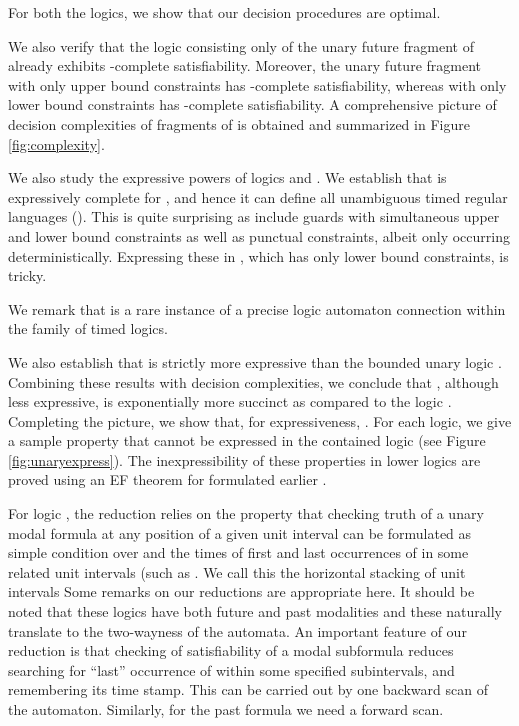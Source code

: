 \documentclass{llncs}
\newcommand{\oomit}[1]{}
\newcommand{\mtlus}{\mbox{}}
\newcommand{\mitlfp}{\mbox{}}
\newcommand{\bmitlfp}{\mbox{}}
\newcommand{\tptlus}{\mbox{}}
\newcommand{\potdta}{\mbox{}}
\newcommand{\ttlxy}{\mbox{}}
\newcommand{\mitlfpinf}{\mbox{}}
\newcommand{\mitlfpb}{\bmitlfp}
\newcommand{\mitl}{\mbox{}}
\newcommand{\pspace}{\mbox{}}
\newcommand{\expspace}{\mbox{}}
\newcommand{\np}{\mbox{}}
\newcommand{\tul}{\mbox{}}
\begin{document}
For both the logics, we show that  our decision procedures are optimal.
\oomit{ the hardness of these and other related logics is established by reduction of a suitable tiling problem to the satisfiability of the concerned unary \mitl\/ fragment.}  
We also verify that the logic  consisting only of the unary future fragment of   already exhibits \expspace-complete satisfiability. Moreover, the unary future fragment  with only upper bound constraints has \pspace-complete satisfiability, whereas   with only lower bound constraints has \np-complete satisfiability.
A comprehensive picture of decision complexities of fragments of  is obtained and summarized in Figure \ref{fig:complexity}.

We also study the expressive powers of logics \mitlfpinf\/ and \mitlfpb.
We establish that \mitlfpinf\/  is expressively complete for \potdta, and hence it can define all unambiguous timed regular languages (\tul). 
This is quite  surprising as  include guards with simultaneous upper and lower bound constraints as well as punctual constraints, albeit only occurring deterministically. Expressing these in , which has only lower bound constraints, is tricky.
\oomit{This \ttlxy\/ logic embodies the freeze quantification (of \tptlus)  and it has both punctual and unbounded constraints, albeit occurring only within deterministic modalities. 
We now show that   can express all  formulas, and the two logics are expressively equivalent. The reduction from  to \mitlfpinf\/ is a variant of another such encoding into the more expressive logic \mitlfp\/ given earlier (see \cite{PS11}).}
We remark that  is a rare instance of a precise logic automaton connection within the \mtlus\/ family of timed logics.


We also establish that   is strictly more expressive than the bounded unary logic . Combining these results with decision complexities, we conclude that , although less expressive, is exponentially more succinct as compared to the logic . Completing the picture, we show that, for expressiveness, . For each logic, we give a sample property that cannot be expressed in the contained logic (see Figure \ref{fig:unaryexpress}). The inexpressibility of these properties in lower logics are proved using an EF theorem for  formulated earlier \cite{PS11}. 


For logic , the reduction relies on the property that checking truth of a unary modal formula  at any position  of a given unit interval  can be formulated as simple condition over  and the times of
first and last occurrences of  in some related unit intervals (such as
. We call this the horizontal stacking of unit intervals
Some remarks on our reductions are appropriate here.
It should be noted that these logics have both future and past modalities and these naturally translate to the two-wayness of the automata. An important feature of our reduction is that checking of satisfiability of a modal subformula  reduces searching for ``last'' occurrence of   within some specified subintervals, and remembering its time stamp. This can be carried out by one backward scan of the automaton.  Similarly, for the past formula  we need a forward scan.
\end{document}

